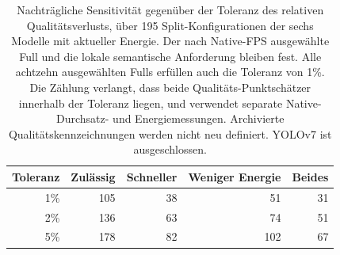 \begin{table}[t]
\centering\small
\setlength{\tabcolsep}{3pt}
\caption{Nachträgliche Sensitivität gegenüber der Toleranz des relativen Qualitätsverlusts, über 195 Split-Konfigurationen der sechs Modelle mit aktueller Energie. Der nach Native-FPS ausgewählte Full und die lokale semantische Anforderung bleiben fest. Alle achtzehn ausgewählten Fulls erfüllen auch die Toleranz von 1\%. Die Zählung verlangt, dass beide Qualitäts-Punktschätzer innerhalb der Toleranz liegen, und verwendet separate Native-Durchsatz- und Energiemessungen. Archivierte Qualitätskennzeichnungen werden nicht neu definiert. YOLOv7 ist ausgeschlossen.}
\label{tab:quality_tolerance}
\begin{tabular}{rrrrr}
\toprule
Toleranz & Zulässig & Schneller & Weniger Energie & Beides\\
\midrule
1\% & 105 & 38 & 51 & 31\\
2\% & 136 & 63 & 74 & 51\\
5\% & 178 & 82 & 102 & 67\\
\bottomrule
\end{tabular}
\end{table}
